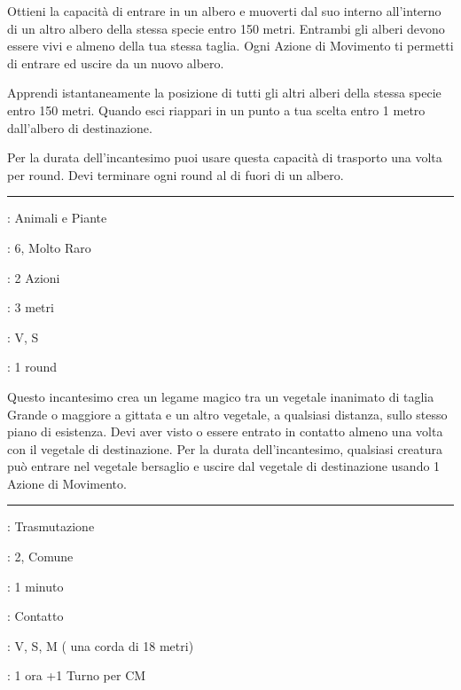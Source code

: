 \begin{multicols}{2}
Ottieni la capacità di entrare in un albero e muoverti dal suo interno all'interno di un altro albero della stessa specie entro 150 metri. Entrambi gli alberi devono essere vivi e almeno della tua stessa taglia. Ogni Azione di Movimento ti permetti di entrare ed uscire da un nuovo albero.

Apprendi istantaneamente la posizione di tutti gli altri alberi della stessa specie entro 150 metri. Quando esci riappari in un punto a tua scelta entro 1 metro dall'albero di destinazione.

Per la durata dell'incantesimo puoi usare questa capacità di trasporto una volta per round. Devi terminare ogni round al di fuori di un albero.

\smallskip\noindent\rule{\linewidth}{2pt} \hypertarget{Trasporto Vegetale}{}\smallskip{}
\noindent
\begin{description}[noitemsep, topsep=0pt, parsep=0pt, partopsep=0pt, leftmargin=0cm, labelwidth=2.8cm]
	\item[\textbf{Lista di Magia}]: Animali e Piante
	\item[\textbf{Livello}]: 6, Molto Raro
	\item[\textbf{T. di Lancio}]: 2 Azioni
	\item[\textbf{Gittata}]: 3 metri
	\item[\textbf{Componenti}]: V, S
	\item[\textbf{Durata}]: 1 round
\end{description}

Questo incantesimo crea un legame magico tra un vegetale inanimato di taglia Grande o maggiore a gittata e un altro vegetale, a qualsiasi distanza, sullo stesso piano di esistenza. Devi aver visto o essere entrato in contatto almeno una volta con il vegetale di destinazione. Per la durata dell'incantesimo, qualsiasi creatura può entrare nel vegetale bersaglio e uscire dal vegetale di destinazione usando 1 Azione di Movimento.

\smallskip\noindent\rule{\linewidth}{2pt} \hypertarget{Trucco della Corda}{}\smallskip{}
\noindent
\begin{description}[noitemsep, topsep=0pt, parsep=0pt, partopsep=0pt, leftmargin=0cm, labelwidth=2.8cm]
	\item[\textbf{Lista di Magia}]: Trasmutazione
	\item[\textbf{Livello}]: 2, Comune
	\item[\textbf{T. di Lancio}]: 1 minuto
	\item[\textbf{Gittata}]: Contatto
	\item[\textbf{Componenti}]: V, S, M ( una corda di 18 metri)
	\item[\textbf{Durata}]: 1 ora +1 Turno per CM
\end{description}


\end{multicols}
